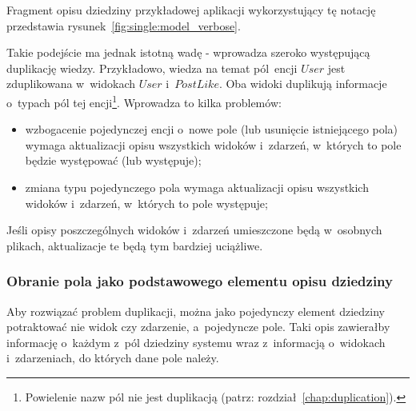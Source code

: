 Fragment opisu dziedziny przykładowej aplikacji wykorzystujący tę notację przedstawia rysunek~\ref{fig:single:model_verbose}.



Takie podejście ma jednak istotną wadę - wprowadza szeroko występującą duplikację wiedzy.
Przykładowo, wiedza na temat pól~encji $User$ jest zduplikowana w~widokach $User$ i~$PostLike$.
Oba widoki duplikują informacje o~typach pól tej encji\footnote{Powielenie nazw pól nie jest duplikacją (patrz: rozdział~\ref{chap:duplication}).}.
Wprowadza to kilka problemów:

\begin{itemize}
 \item wzbogacenie pojedynczej encji o~nowe pole (lub usunięcie istniejącego pola) wymaga aktualizacji opisu wszystkich widoków i~zdarzeń, w~których to pole będzie występować (lub występuje);
 \item zmiana typu pojedynczego pola wymaga aktualizacji opisu wszystkich widoków i~zdarzeń, w~których to pole występuje;
\end{itemize}

Jeśli opisy poszczególnych widoków i~zdarzeń umieszczone będą w~osobnych plikach, aktualizacje te będą tym bardziej uciążliwe.

%
%
%
%
%

\subsubsection{Obranie pola jako podstawowego elementu opisu dziedziny}

Aby rozwiązać problem duplikacji, można jako pojedynczy element dziedziny potraktować nie widok czy zdarzenie, a~pojedyncze pole.
Taki opis zawierałby informację o~każdym z~pól dziedziny systemu wraz z~informacją o~widokach i~zdarzeniach, do których dane pole należy.

